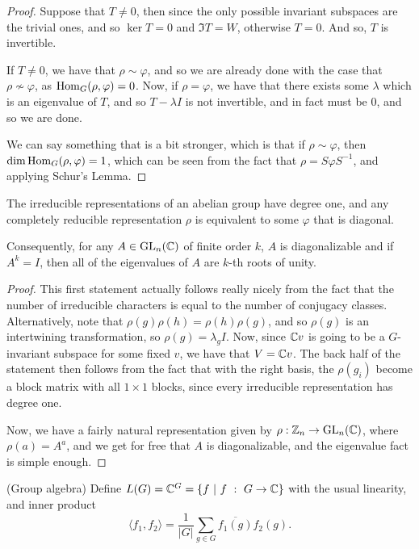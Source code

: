 \documentclass{article}
\renewcommand{\phi}{\varphi}
\begin{document}
\begin{proof}

Suppose that $T \neq 0$, then since the only possible invariant subspaces are the trivial ones, and so $\ker T = 0$ and $\Im T = W$, otherwise $T = 0$. And so, $T$ is invertible.

If $T \neq 0$, we have that $\rho \sim \phi$, and so we are already done with the case that $\rho \not\sim \phi$, as $\Hom_G(\rho,\phi) = 0$. Now, if $\rho = \phi$, we have that there exists some $\lambda$ which is an eigenvalue of $T$, and so $T-\lambda I $ is not invertible, and in fact must be $0$, and so we are done. 

We can say something that is a bit stronger, which is that if $\rho \sim \phi$, then $\dim \Hom_G(\rho, \phi) = 1$, which can be seen from the fact that $\rho = S \phi S^{-1}$, and applying Schur's Lemma.
\end{proof}

\begin{corollary}
The irreducible representations of an abelian group have degree one, and any completely reducible representation $\rho$ is equivalent to some $\phi$ that is diagonal.

Consequently, for any $A \in \operatorname{GL}_n(\mathbb C)$ of finite order $k$, $A$ is diagonalizable and if $A^k = I$, then all of the eigenvalues of $A$ are $k$-th roots of unity.
\end{corollary}
\begin{proof}
This first statement actually follows really nicely from the fact that the number of irreducible characters is equal to the number of conjugacy classes. Alternatively, note that $\rho(g)\rho(h) = \rho(h)\rho(g)$, and so $\rho(g)$ is an intertwining transformation, so $\rho(g) = \lambda_g I$. Now, since $\mathbb C v$ is going to be a $G$-invariant subspace for some fixed $v$, we have that $V = \mathbb C v$. The back half of the statement then follows from the fact that with the right basis, the $\rho(g_i)$ become a block matrix with all $1 \times 1$ blocks, since every irreducible representation has degree one.

Now, we have a fairly natural representation given by $\rho : \mathbb Z_n \to \operatorname{GL}_n(\mathbb C)$, where $\rho(a) = A^a$, and we get for free that $A$ is diagonalizable, and the eigenvalue fact is simple enough.
\end{proof}

\begin{definition}
(Group algebra) Define $L(G) = \mathbb C^G = \{ f \ | \ f \ : \ G \to \mathbb C \}$ with the usual linearity, and inner product $$\langle f_1, f_2 \rangle = \frac{1}{|G|} \sum_{g \in G} \overline{f_1(g)}f_2(g).$$
\end{definition}
\end{document}

